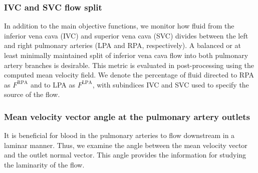 \subsubsection*{IVC and SVC flow split}
In addition to the main objective functions, we monitor how fluid from the inferior vena cava (IVC) and superior vena cava (SVC) divides between the left and right pulmonary arteries  (LPA and RPA, respectively). A balanced or at least minimally maintained split of inferior vena cava flow into both pulmonary artery branches is desirable. This metric is evaluated in post-processing using the computed mean velocity field. We denote the percentage of fluid directed to RPA as $F^{\text{RPA}}$ and to LPA as $F^{\text{LPA}}$, with subindices IVC and SVC used to specify the source of the flow.

\subsubsection*{Mean velocity vector angle at the pulmonary artery outlets}
It is beneficial for blood in the pulmonary arteries to flow downstream in a laminar manner. Thus, we examine the angle between the mean velocity vector and the outlet normal vector. This angle provides the information  for studying the laminarity of the flow.
